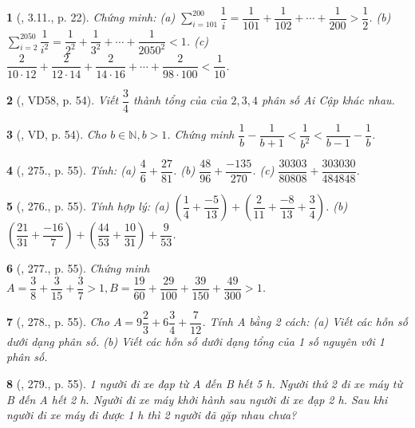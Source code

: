 \documentclass{article}
\newtheorem{baitoan}{}
\begin{document}
\begin{baitoan}[\cite{Binh_boi_duong_Toan_6_tap_2}, 3.11., p. 22]
	Chứng minh: (a) $\sum_{i=101}^{200} \dfrac{1}{i} = \dfrac{1}{101} + \dfrac{1}{102} + \cdots + \dfrac{1}{200} > \dfrac{1}{2}$. (b) $\sum_{i=2}^{2050} \dfrac{1}{i^2} = \dfrac{1}{2^2} + \dfrac{1}{3^2} + \cdots + \dfrac{1}{2050^2} < 1$. (c) $\dfrac{2}{10\cdot12} + \dfrac{2}{12\cdot14} + \dfrac{2}{14\cdot16} + \cdots + \dfrac{2}{98\cdot100} < \dfrac{1}{10}$.
\end{baitoan}

\begin{baitoan}[\cite{Tuyen_Toan_6}, VD58, p. 54]
	Viết $\dfrac{3}{4}$ thành tổng của của $2,3,4$ phân số Ai Cập khác nhau.
\end{baitoan}

\begin{baitoan}[\cite{Tuyen_Toan_6}, VD, p. 54]
	Cho $b\in\mathbb{N},b > 1$. Chứng minh $\dfrac{1}{b} - \dfrac{1}{b + 1} < \dfrac{1}{b^2} < \dfrac{1}{b - 1} - \dfrac{1}{b}$.
\end{baitoan}

\begin{baitoan}[\cite{Tuyen_Toan_6}, 275., p. 55]
	Tính: (a) $\dfrac{4}{6} + \dfrac{27}{81}$. (b) $\dfrac{48}{96} + \dfrac{-135}{270}$. (c) $\dfrac{30303}{80808} + \dfrac{303030}{484848}$.
\end{baitoan}

\begin{baitoan}[\cite{Tuyen_Toan_6}, 276., p. 55]
	Tính hợp lý: (a) $\left(\dfrac{1}{4} + \dfrac{-5}{13}\right) + \left(\dfrac{2}{11} + \dfrac{-8}{13} + \dfrac{3}{4}\right)$. (b) $\left(\dfrac{21}{31} + \dfrac{-16}{7}\right) + \left(\dfrac{44}{53} + \dfrac{10}{31}\right) + \dfrac{9}{53}$.
\end{baitoan}

\begin{baitoan}[\cite{Tuyen_Toan_6}, 277., p. 55]
	Chứng minh $A = \dfrac{3}{8} + \dfrac{3}{15} + \dfrac{3}{7} > 1,B = \dfrac{19}{60} + \dfrac{29}{100} + \dfrac{39}{150} + \dfrac{49}{300} > 1$.
\end{baitoan}

\begin{baitoan}[\cite{Tuyen_Toan_6}, 278., p. 55]
	Cho $A = 9\dfrac{2}{3} + 6\dfrac{3}{4} + \dfrac{7}{12}$. Tính A bằng 2 cách: (a) Viết các hỗn số dưới dạng phân số. (b) Viết các hỗn số dưới dạng tổng của 1 số nguyên với 1 phân số.
\end{baitoan}

\begin{baitoan}[\cite{Tuyen_Toan_6}, 279., p. 55]
	1 người đi xe đạp từ A đến B hết {\rm5 h}. Người thứ 2 đi xe máy từ B đến A hết {\rm2 h}. Người đi xe máy khởi hành sau người đi xe đạp {\rm2 h}. Sau khi người đi xe máy đi được {\rm1 h} thì 2 người đã gặp nhau chưa?
\end{baitoan}
\end{document}
